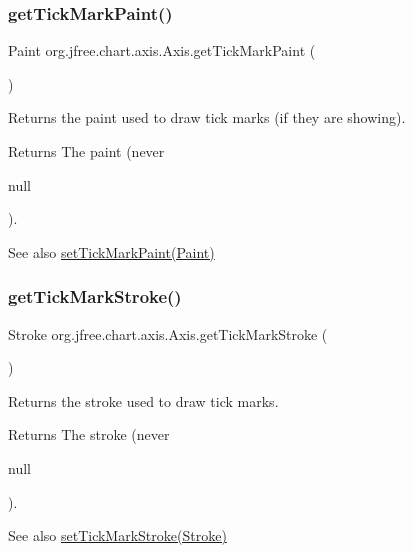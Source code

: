 \subsubsection{\texorpdfstring{get\+Tick\+Mark\+Paint()}{getTickMarkPaint()}}
{\footnotesize\ttfamily Paint org.\+jfree.\+chart.\+axis.\+Axis.\+get\+Tick\+Mark\+Paint (\begin{DoxyParamCaption}{ }\end{DoxyParamCaption})}

Returns the paint used to draw tick marks (if they are showing).

\begin{DoxyReturn}{Returns}
The paint (never
\begin{DoxyCode}
null 
\end{DoxyCode}
 ).
\end{DoxyReturn}
\begin{DoxySeeAlso}{See also}
\mbox{\hyperlink{classorg_1_1jfree_1_1chart_1_1axis_1_1_axis_a1608c6dd5ac66a80306a06faa4b65905}{set\+Tick\+Mark\+Paint(\+Paint)}} 
\end{DoxySeeAlso}
\mbox{\label{classorg_1_1jfree_1_1chart_1_1axis_1_1_axis_a2d8786d95acfa7706629df7e96b2a2b1}} 
\subsubsection{\texorpdfstring{get\+Tick\+Mark\+Stroke()}{getTickMarkStroke()}}
{\footnotesize\ttfamily Stroke org.\+jfree.\+chart.\+axis.\+Axis.\+get\+Tick\+Mark\+Stroke (\begin{DoxyParamCaption}{ }\end{DoxyParamCaption})}

Returns the stroke used to draw tick marks.

\begin{DoxyReturn}{Returns}
The stroke (never
\begin{DoxyCode}
null 
\end{DoxyCode}
 ).
\end{DoxyReturn}
\begin{DoxySeeAlso}{See also}
\mbox{\hyperlink{classorg_1_1jfree_1_1chart_1_1axis_1_1_axis_a119d5db3e19f77358279223fe3811c21}{set\+Tick\+Mark\+Stroke(\+Stroke)}} 
\end{DoxySeeAlso}
\mbox{\label{classorg_1_1jfree_1_1chart_1_1axis_1_1_axis_aa31c39d888c54cba84061d6439541f65}} 
